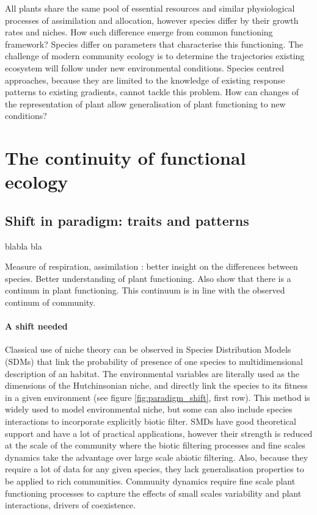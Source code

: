 All plants share the same pool of essential resources and similar physiological processes of assimilation and allocation, however species differ by their growth rates and niches. How such difference emerge  from common functioning framework? Species differ on parameters that characterise this functioning. The challenge of modern community ecology is to determine the trajectories existing ecosystem will follow under new environmental conditions. Species centred approaches, because they are limited to the knowledge of existing response patterns to existing gradients, cannot tackle this 
problem. How can changes of the representation of plant allow generalisation of plant functioning to new conditions?

\section{The continuity of functional ecology}

\subsection{Shift in paradigm: traits and patterns}
 blabla bla 

Measure of respiration, assimilation : better insight on the differences between species. Better understanding of plant functioning. Also show that there is a continum in plant functioning. This continuum is in line with the observed continum of community.

\paragraph{A shift needed}

Classical use of niche theory can be observed in Species Distribution Models (SDMs) that link the probability of presence of one species to multidimensional description of an habitat. The environmental variables are literally used as the dimensions of the Hutchinsonian niche, and directly link the species to its fitness in a given environment (see figure \ref{fig:paradigm_shift}, first row). This method is widely used to model environmental niche, but some can also include species interactions to incorporate explicitly biotic filter. SMDs have good theoretical support and have a lot of practical applications, however their strength is reduced at the scale of the community where the biotic filtering processes and fine scales dynamics take the advantage over large scale abiotic filtering. Also, because they require a lot of data for any given species, they lack generalisation properties to be applied to rich communities. Community dynamics require fine scale plant functioning processes to capture the effects of small scales variability and plant interactions, drivers of coexistence. 

